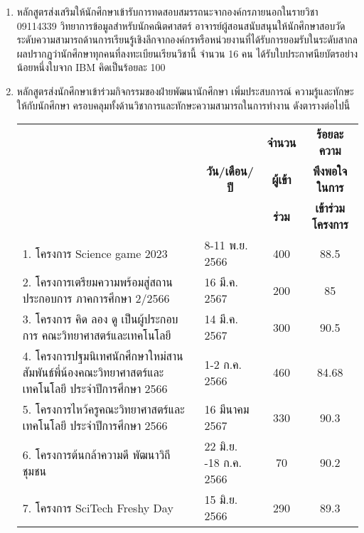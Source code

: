 \begin{enumerate}
\item หลักสูตรส่งเสริมให้นักศึกษาเข้ารับการทดสอบสมรรถนะจากองค์กรภายนอกในรายวิชา 09114339 วิทยาการข้อมูลสำหรับนักคณิตศาสตร์ อาจารย์ผู้สอนสนับสนุนให้นักศึกษาสอบวัดระดับความสามารถด้านการเรียนรู้เชิงลึกจากองค์กรหรือหน่วยงานที่ได้รับการยอมรับในระดับสากล ผลปรากฏว่านักศึกษาทุกคนที่ลงทะเบียนเรียนวิชานี้ จำนวน 16 คน ได้รับใบประกาศนียบัตรอย่างน้อยหนึ่งใบจาก IBM คิดเป็นร้อยละ 100
\item หลักสูตรส่งนักศึกษาเข้าร่วมกิจกรรมของฝ่ายพัฒนานักศึกษา เพิ่มประสบการณ์ ความรู้และทักษะให้กับนักศึกษา ครอบคลุมทั้งด้านวิชาการและทักษะความสามารถในการทำงาน ดังตารางต่อไปนี้ \\[3mm]
\begin{tabular}{ |>{\raggedright}p{5.8cm}|p{2.2cm}|c|c|} 
\hline
\multicolumn{1}{|c|}{\multirow{3}{*}{\textbf{ชื่อโครงการ/กิจกรรม}}} & \multicolumn{1}{c|}{\multirow{3}{*}{\textbf{วัน/เดือน/ปี}}} &   \textbf{จำนวน}  &   \textbf{ร้อยละความ} \\   
                  &                   & \textbf{ผู้เข้า}  &  \textbf{พึงพอใจในการ}\\   
                  &                   & \textbf{ร่วม}  & \textbf{เข้าร่วมโครงการ}\\ \hline
           
1. โครงการ Science game 2023 & 8-11 พ.ย. 2566 & 400 & 88.5\\
\hline
2.  โครงการเตรียมความพร้อมสู่สถานประกอบการ ภาคการศึกษา 2/2566 & 16 มี.ค. 2567 & 200 & 85\\
\hline
3.  โครงการ คิด ลอง ดู เป็นผู้ประกอบการ คณะวิทยาศาสตร์และเทคโนโลยี & 14 มี.ค. 2567 & 300 & 90.5 \\
\hline
4. โครงการปฐมนิเทศนักศึกษาใหม่สานสัมพันธ์พี่น้องคณะวิทยาศาสตร์และเทคโนโลยี ประจำปีการศึกษา 2566  & 1-2 ก.ค. 2566 & 460 & 84.68\\
\hline
5.  โครงการไหว้ครูคณะวิทยาศาสตร์และเทคโนโลยี ประจำปีการศึกษา 2566 & 16 มีนาคม 2567 & 330 & 90.3\\
\hline
6.  โครงการต้นกล้าความดี พัฒนาวิถีชุมชน & 22 มิ.ย. -18 ก.ค. 2566 &  70 & 90.2 \\
\hline
7.  โครงการ SciTech Freshy Day & 15 มิ.ย. 2566 & 290 & 89.3 \\
\hline
\end{tabular}
\end{enumerate}
\begin{doclist}
\end{doclist}


